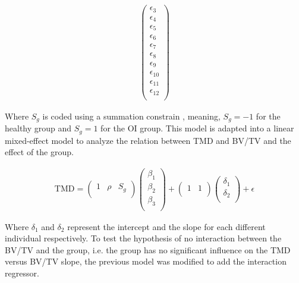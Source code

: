 \documentclass[a4paper,fleqn]{DC_ArtStyle}
\begin{document}
\begin{equation}
\begin{split}
\begin{pmatrix}
	\epsilon_{3} \\
	\epsilon_{4} \\
	\epsilon_{5} \\
	\epsilon_{6} \\
	\epsilon_{7} \\
	\epsilon_{8} \\
	\epsilon_{9} \\
	\epsilon_{10} \\
	\epsilon_{11} \\
	\epsilon_{12} \\
	\end{pmatrix}
	\end{split}
	\end{equation}
	
	Where $S_g$ is coded using a summation constrain \cite{Fox2016}, meaning, $S_g = -1$ for the healthy group and $S_g = 1$ for the OI group. This model is adapted into a linear mixed-effect model to analyze the relation between TMD and BV/TV and the effect of the group.
	
	\begin{equation}
	\begin{split}
	\text{TMD} = \begin{pmatrix}
	1 & \rho & S_g \\
	\end{pmatrix} \begin{pmatrix}
	\beta_1 \\
	\beta_2 \\
	\beta_3 \\
	\end{pmatrix} + \begin{pmatrix}
	1 & 1 \\
	\end{pmatrix}\begin{pmatrix}
	\delta_1 \\
	\delta_2 \\
	\end{pmatrix} + \epsilon
	\end{split}
	\label{EqA14}
	\end{equation}
	
	Where $\delta_1$ and $\delta_2$ represent the intercept and the slope for each different individual respectively. To test the hypothesis of no interaction between the BV/TV and the group, i.e. the group has no significant influence on the TMD versus BV/TV slope, the previous model was modified to add the interaction regressor.
	
\end{document}
